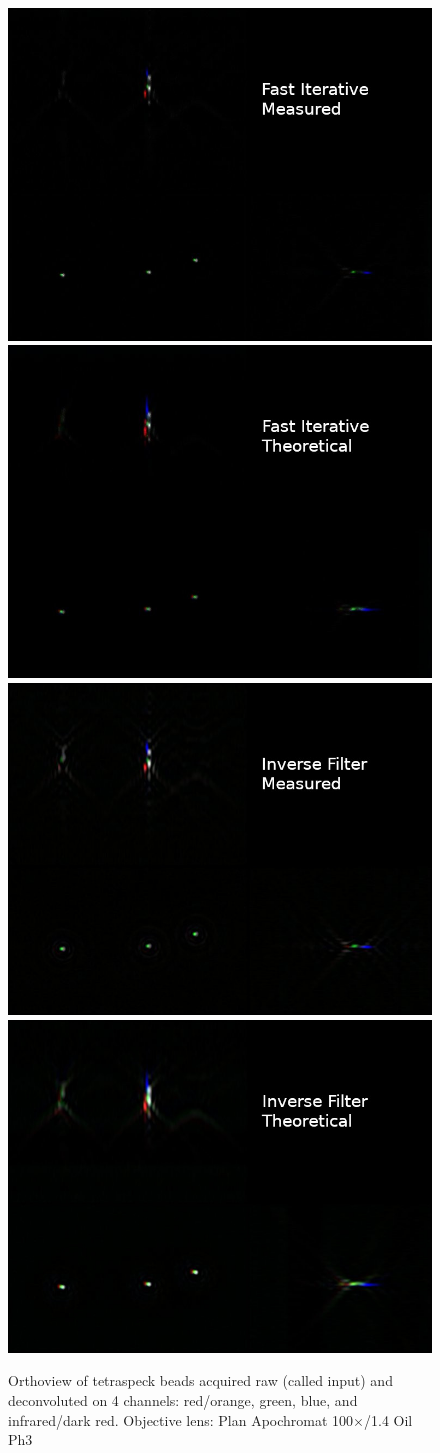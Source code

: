 \begin{figure}
\includegraphics[width=.48\columnwidth]{Exp_7_Deconvolution/Figures/bcomposite/g_b_fastiterc}
\includegraphics[width=.48\columnwidth]{Exp_7_Deconvolution/Figures/bcomposite/g_b_fastitert}\\
\includegraphics[width=.48\columnwidth]{Exp_7_Deconvolution/Figures/bcomposite/g_b_invfilc}
\includegraphics[width=.48\columnwidth]{Exp_7_Deconvolution/Figures/bcomposite/g_b_invfilt}\\
\caption{Orthoview of tetraspeck beads acquired raw (called input) and deconvoluted on 4 channels: red/orange, green, blue, and infrared/dark red. Objective lens: Plan Apochromat 100$\times$/1.4 Oil Ph3}
\label{fig:beads}
\end{figure}


